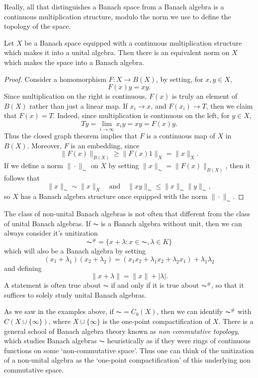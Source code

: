 Really, all that distinguishes a Banach space from a Banach algebra is a continuous multiplication structure, modulo the norm we use to define the topology of the space.

\begin{prop}
    Let $X$ be a Banach space equipped with a continuous multiplication structure which makes it into a unital algebra. Then there is an equivalent norm on $X$ which makes the space into a Banach algebra.
\end{prop}
\begin{proof}
    Consider a homomorphism $F: X \to B(X)$, by setting, for $x,y \in X$,
    \[ F(x)y = xy. \]
    Since multiplication on the right is continuous, $F(x)$ is truly an element of $B(X)$ rather than just a linear map. If $x_i \to x$, and $F(x_i) \to T$, then we claim that $F(x) = T$. Indeed, since multiplication is continuous on the left, for $y \in X$,
    \[ Ty = \lim_{i \to \infty} x_i y = xy = F(x)y. \]
    Thus the closed graph theorem implies that $F$ is a continuous map of $X$ in $B(X)$. Moreover, $F$ is an embedding, since
    \[ \| F(x) \|_{B(X)} \geq \| F(x) 1 \|_X = \| x \|_X. \]
    If we define a norm $\| \cdot \|_{\AC}$ on $X$ by setting $\| x \|_{\AC} = \| F(x) \|_{B(X)}$, then it follows that
    \[ \| x \|_{\AC} \sim \| x \|_X \quad\text{and}\quad \| xy \|_{\AC} \leq \| x \|_{\AC} \| y \|_{\AC}, \]
    so $X$ has a Banach algebra structure once equipped with the norm $\| \cdot \|_{\AC}$.
\end{proof}

The class of non-unital Banach algebras is not often that different from the class of unital Banach algebras. If $\AC$ is a Banach algebra without unit, then we can always consider it's unitization
%
\[ \AC^\# = \{ x + \lambda : x \in \AC, \lambda \in K \} \]
%
which will also be a Banach algebra by setting
%
\[ (x_1 + \lambda_1)(x_2 + \lambda_2) = (x_1x_2 + \lambda_1 x_2 + \lambda_2 x_1) + \lambda_1 \lambda_2 \]
%
and defining
%
\[ \| x + \lambda \| = \| x \| + |\lambda|. \]
%
A statement is often true about $\AC$ if and only if it is true about $\AC^\#$, so that it suffices to solely study unital Banach algebras.

As we saw in the examples above, if $\AC = C_0(X)$, then we can identify $\AC^\#$ with $C(X \cup \{ \infty \})$, where $X \cup \{ \infty \}$ is the one-point compactification of $X$. There is a general school of Banach algebra theory known as \emph{non commutative topology}, which studies Banach algebras $\AC$ heuristically as if they were rings of continuous functions on some `non-commutative space'. Thus one can think of the unitization of a non-unital algebra as the `one-point compactification' of this underlying non commutative space.

